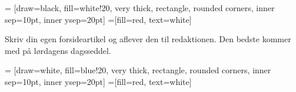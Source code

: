 

\begin{minipage}[b]{0.95\linewidth}
\begin{minipage}[t]{0.47\textwidth}
\vspace{3mm}

 = [draw=black, fill=white!20, very thick,
    rectangle, rounded corners, inner sep=10pt, inner ysep=20pt]
 =[fill=red, text=white]

%

Skriv din egen forsideartikel og aflever den til redaktionen. Den bedste kommer med på lørdagens dagsseddel.

\end{minipage}
\hfill\begin{minipage}[t]{0.47\textwidth}

\vspace{1mm}
 = [draw=white, fill=blue!20, very thick,
    rectangle, rounded corners, inner sep=10pt, inner ysep=20pt]
 =[fill=red, text=white]

%


\end{minipage}
\end{minipage}
